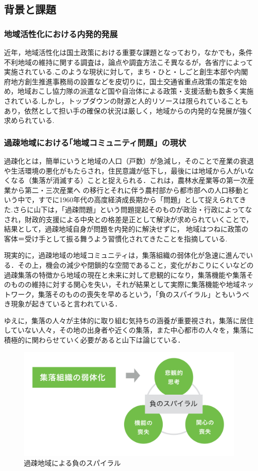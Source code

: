 \documentclass[a4paper]{jsarticle}
\begin{document}
\subsection{背景と課題}
\subsubsection{地域活性化における内発的発展}
近年，地域活性化は国土政策における重要な課題となっており，なかでも，条件不利地域の維持に関する調査は，論点や調査方法こそ異なるが，各省庁によって実施されている.このような現状に対して，まち・ひと・しごと創生本部や内閣府地方創生推進事務局の設置などを皮切りに，国土交通省重点政策\cite{2}の策定を始め，地域おこし協力隊の派遣など国や自治体による政策・支援活動も数多く実施されている.しかし，トップダウンの財源と人的リソースは限られていることもあり，依然として担い手の確保の状況は厳しく，地域からの内発的な発展が強く求められている.
\subsubsection{過疎地域における｢地域コミュニティ問題」の現状}
過疎化とは，簡単にいうと地域の人口（戸数）が急減し，そのことで産業の衰退や生活環境の悪化がもたらされ，住民意識が低下し，最後には地域から人がいなくなる（集落が消滅する）ことと捉えられる．\cite{3}これは，農林水産業等の第一次産業から第二・三次産業へ の移行とそれに伴う農村部から都市部への人口移動という中で，すでに1960年代の高度経済成長期から「問題」として捉えられてきた.\cite{4}さらに山下は，「過疎問題」という問題提起そのものが政治・行政によってなされ，財政的支援による中央との格差是正として解決が求められていくことで，結果として，過疎地域自身が問題を内発的に解決せずに， 地域はつねに政策の客体＝受け手として振る舞うよう習慣化されてきたことを指摘している.\cite{5}\par
現実的に，過疎地域の地域コミュニティは，集落組織の弱体化が急速に進んでいる．その上，機会の減少や閉鎖的な空間であること，変化がおこりにくいなどの過疎集落の特徴から地域の現在と未来に対して悲観的になり，集落機能や集落そのものの維持に対する関心を失い，それが結果として実際に集落機能や地域ネットワーク，集落そのものの喪失を早めるという，「負のスパイラル」ともいうべき現象が起きていると言われている．\cite{6}\par
ゆえに，集落の人々が主体的に取り組む気持ちの涵養が重要視され，集落に居住していない人々，その地の出身者や近くの集落，また中心都市の人々を，集落に積極的に関わらせていく必要があると山下は論じている．\cite{7}

\begin{figure}[H]
  \begin{center}
    \includegraphics[width=0.7\hsize]{./images/17.png}
    \caption{過疎地域による負のスパイラル}
    \label{fig:tmu_hino}
  \end{center}
\end{figure}
\end{document}
